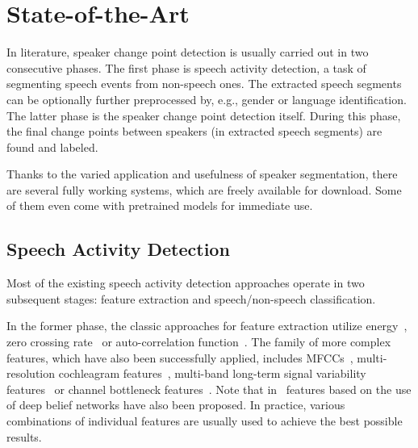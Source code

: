 \documentclass[FM,noheader,EN,bwtitles]{tulthesis}
\begin{document}
\chapter{State-of-the-Art}
\label{ch:stateOfTheArt}


In literature, speaker change point detection is usually carried out in two consecutive phases.
The first phase is speech activity detection, a task of segmenting speech events from non-speech ones.
The extracted speech segments can be optionally further preprocessed by, e.g., gender or language identification.
The latter phase is the speaker change point detection itself. 
During this phase, the final change points between speakers (in extracted speech segments) are found and labeled.

Thanks to the varied application and usefulness of speaker segmentation, there are several fully working systems, which are freely available for download.
Some of them even come with pretrained models for immediate use.

\section{Speech Activity Detection}
\label{s:sad}

Most of the existing speech activity detection approaches operate in two subsequent stages: feature extraction and speech/non-speech classification.

In the former phase, the classic approaches for feature extraction utilize energy~\parencite{DBLP:conf/interspeech/EvangelopoulosM05}, zero crossing rate~\parencite{DBLP:conf/interspeech/KotnikKH01} or auto-correlation function~\parencite{DBLP:conf/interspeech/GhaemmaghamiBVS10}.
The family of more complex features, which have also been successfully applied, includes MFCCs~\parencite{DBLP:conf/interspeech/SriskandarajaSL15, DBLP:conf/interspeech/RyantLY13}, multi-resolution cochleagram features~\parencite{DBLP:conf/interspeech/ZhangW14}, multi-band long-term signal variability features~\parencite{DBLP:conf/interspeech/TsiartasCKGLSPN13} or channel bottleneck features~\parencite{DBLP:conf/interspeech/Ma14}.
Note that in~\parencite{DBLP:journals/taslp/ZhangW13} features based on the use of deep belief networks have also been proposed.
In practice, various combinations of individual features are usually used to achieve the best possible results.
\end{document}
